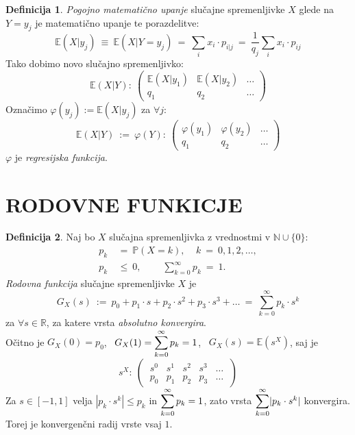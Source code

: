 \documentclass[11pt]{article}
\theoremstyle{definition}
\newtheorem{definicija}{Definicija}[section]
\theoremstyle{definition}
\theoremstyle{definition}
\begin{document}
\begin{definicija}

\textit{Pogojno matematično upanje} slučajne spremenljivke $X$ glede na $Y = y_j$ je matematično upanje te porazdelitve:
$$\mathbb{E}(X | y_j) ~\equiv~ \mathbb{E}(X | Y = y_j) ~=~ \sum_i x_i \cdot p_{i|j} ~=~ \frac{1}{q_j} \sum_i x_i \cdot p_{ij}$$
Tako dobimo novo slučajno spremenljivko:
$$\mathbb{E}(X | Y): ~\begin{pmatrix}
	\mathbb{E}(X | y_1) & \mathbb{E}(X | y_2) & \ldots \\
	q_1 & q_2 & \ldots
\end{pmatrix}$$
Označimo $\varphi(y_j) := \mathbb{E}(X | y_j)$ za $\forall j$:
$$\mathbb{E}(X | Y) ~:=~ \varphi(Y): ~\begin{pmatrix}
	\varphi(y_1) & \varphi(y_2) & \ldots \\
	q_1 & q_2 & \ldots
\end{pmatrix}$$
$\varphi$ je \textit{regresijska funkcija}.

\end{definicija}
\vspace{0.5cm}

\pagebreak


\section{RODOVNE FUNKICJE}
\vspace{0.5cm}

\begin{definicija}

Naj bo $X$ slučajna spremenljivka z vrednostmi v $\mathbb{N} \cup \{0\}$:
\begin{align*}
	p_k ~&=~ \mathbb{P}(X = k), ~~~~~k ~=~ 0, 1, 2, \ldots, \\
	p_k ~&\leq~ 0, ~~~~~~~~~~\sum_{k=0}^{\infty} p_k ~=~ 1.
\end{align*}
\textit{Rodovna funkcija} slučajne spremenljivke $X$ je 
$$G_X(s) ~:=~ p_0 + p_1 \cdot s + p_2 \cdot s^2 + p_3 \cdot s^3 + \ldots ~=~ \sum_{k=0}^{\infty} p_k \cdot s^k$$
za $\forall s \in \mathbb{R}$, za katere vrsta \textit{absolutno konvergira}. \\

\noindent Očitno je $G_X(0) = p_0$, ~$G_X(1) = \mathlarger{\sum_{k=0}^{\infty} p_k} = 1$, ~$G_X(s) = \mathbb{E}(s^X)$, saj je
$$s^X: ~\begin{pmatrix}
	~s^0 & s^1 & s^2 & s^3 & \ldots~ \\
	~p_0 & p_1 & p_2 & p_3 & \ldots~
\end{pmatrix}$$
Za $s \in [-1, 1]$ velja $|p_k \cdot s^k| \leq p_k$ in $\mathlarger{\sum_{k=0}^{\infty} p_k = 1}$, zato vrsta $\mathlarger{\sum_{k=0}^{\infty}} |p_k \cdot s^k|$ konvergira. Torej je konvergenčni radij vrste vsaj $1$.

\end{definicija}
\vspace{0.5cm}
\end{document}
